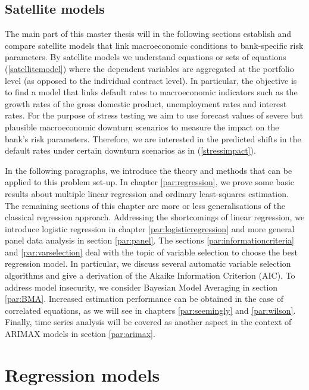 \documentclass[a4paper, 12pt]{scrreprt}
\begin{document}
\subsection{Satellite models}\label{sec:satellite}

The main part of this master thesis will in the following sections establish and compare satellite models that link macroeconomic conditions to bank-specific risk parameters. By satellite models we understand equations or sets of equations (\ref{satellitemodel}) where the dependent variables are aggregated at the portfolio level (as opposed to the individual contract level). 
In particular, the objective is to find a model that links default rates to macroeconomic indicators such as the growth rates of the gross domestic product, unemployment rates and interest rates.
For the purpose of stress testing we aim to use forecast values of severe but plausible macroeconomic downturn scenarios to measure the impact on the bank's risk parameters. 
Therefore, we are interested in the predicted shifts in the default rates under certain downturn scenarios as in (\ref{stressimpact}).

\bigskip

In the following paragraphs, we introduce the theory and methods that can be applied to this problem set-up. In chapter \ref{par:regression}, we prove some basic results about multiple linear regression and ordinary least-squares estimation. 
The remaining sections of this chapter are more or less generalisations of the classical regression approach. Addressing the shortcomings of linear regression, we introduce logistic regression in chapter \ref{par:logisticregression} and more general panel data analysis in section \ref{par:panel}. 
The sections \ref{par:informationcriteria} and \ref{par:varselection} deal with the topic of variable selection to choose the best regression model. In particular, we discuss several automatic variable selection algorithms and give a derivation of the Akaike Information Criterion (AIC).
To address model insecurity, we consider Bayesian Model Averaging in section \ref{par:BMA}.
Increased estimation performance can be obtained in the case of correlated equations, as we will see in chapters \ref{par:seemingly} and \ref{par:wilson}. 
Finally, time series analysis will be covered as another aspect in the context of ARIMAX models in section \ref{par:arimax}.

\section{Regression models}\label{section:logistic regression}
\end{document}
